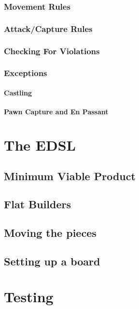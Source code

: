 \documentclass[12pt, a4paper, bibliography=totocnumbered]{scrreprt}
\begin{document}
\subsection{Movement Rules}

\subsection{Attack/Capture Rules}

\subsection{Checking For Violations}

\subsection{Exceptions}

\subsubsection{Castling}

\subsubsection{Pawn Capture and En Passant}

\chapter{The EDSL}

\section{Minimum Viable Product}

\section{Flat Builders}

\section{Moving the pieces}

\section{Setting up a board}

\chapter{Testing}
\end{document}
